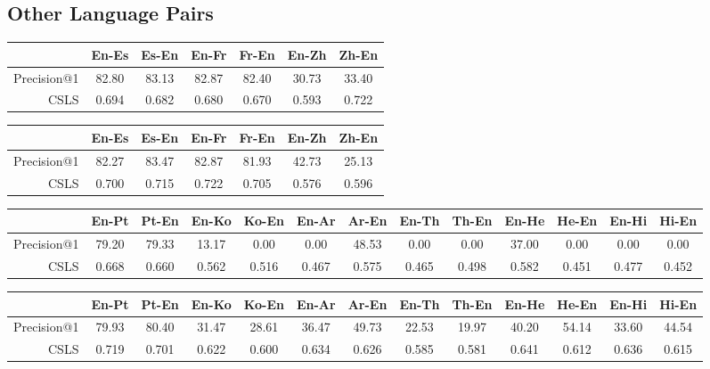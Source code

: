 \documentclass{article}
\begin{document}
\subsection*{Other Language Pairs}

\begin{table}[h]
  \centering
  \begin{tabular}{||r|cc|cc|cc||}
    \hline
    & En-Es & Es-En & En-Fr & Fr-En & En-Zh & Zh-En \\
    \hline
    Precision@1 & 82.80 & 83.13 & 82.87 & 82.40 & 30.73 & 33.40 \\
    CSLS        & 0.694 & 0.682 & 0.680 & 0.670 & 0.593 & 0.722 \\
    \hline
  \end{tabular}
\end{table}

\begin{table}[h]
  \centering
  \begin{tabular}{||r|cc|cc|cc||}
    \hline
    & En-Es & Es-En & En-Fr & Fr-En & En-Zh & Zh-En \\
    \hline
    Precision@1 & 82.27 & 83.47 & 82.87 & 81.93 & 42.73 & 25.13 \\
    CSLS        & 0.700 & 0.715 & 0.722 & 0.705 & 0.576 & 0.596 \\
    \hline
  \end{tabular}
\end{table}

\begin{table}
  \tabcolsep=0.07cm
  \begin{tabular}{||r|cc|cc|cc|cc|cc|cc||}
    \hline
    & En-Pt & Pt-En & En-Ko & Ko-En & En-Ar & Ar-En & En-Th & Th-En
    & En-He & He-En & En-Hi & Hi-En \\
    \hline
    Precision@1 & 79.20 & 79.33 & 13.17 &  0.00 &  0.00 & 48.53 &  0.00 &  0.00
      & 37.00 &  0.00 &  0.00 &  0.00 \\
    CSLS        & 0.668 & 0.660 & 0.562 & 0.516 & 0.467 & 0.575 & 0.465 & 0.498
      & 0.582 & 0.451 & 0.477 & 0.452 \\
    \hline
  \end{tabular}
\end{table}

\begin{table}
  \centering
  \tabcolsep=0.07cm
  \begin{tabular}{||r|cc|cc|cc|cc|cc|cc||}
    \hline
    & En-Pt & Pt-En & En-Ko & Ko-En & En-Ar & Ar-En & En-Th & Th-En
    & En-He & He-En & En-Hi & Hi-En \\
    \hline
    Precision@1 & 79.93 & 80.40 & 31.47 & 28.61 & 36.47 & 49.73 & 22.53 & 19.97
      & 40.20 & 54.14 & 33.60 & 44.54 \\
    CSLS        & 0.719 & 0.701 & 0.622 & 0.600 & 0.634 & 0.626 & 0.585 & 0.581
      & 0.641 & 0.612 & 0.636 & 0.615 \\
    \hline
  \end{tabular}
\end{table}
\end{document}
